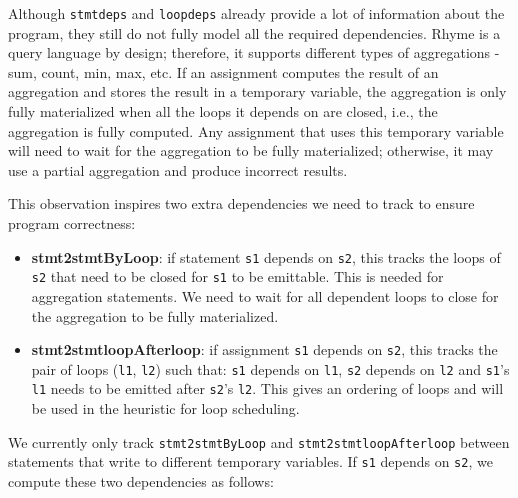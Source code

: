 \documentclass[sigplan, nonacm]{acmart}\settopmatter{printfolios=true,printccs=false,printacmref=false}
\begin{document}
\fi
Although \texttt{stmtdeps} and \texttt{loopdeps} already provide a lot of information about the program, they still do not fully model all the required dependencies. Rhyme is a query language by design; therefore, it supports different types of aggregations - sum, count, min, max, etc. If an assignment computes the result of an aggregation and stores the result in a temporary variable, the aggregation is only fully materialized when all the loops it depends on are closed, i.e., the aggregation is fully computed. Any assignment that uses this temporary variable will need to wait for the aggregation to be fully materialized; otherwise, it may use a partial aggregation and produce incorrect results.\par
This observation inspires two extra dependencies we need to track to ensure program correctness:
\begin{itemize}
\item \textbf{stmt2stmtByLoop}: if statement \texttt{s1} depends on \texttt{s2}, this tracks the loops of \texttt{s2} that need to be closed for \texttt{s1} to be emittable. This is needed for aggregation statements. We need to wait for all dependent loops to close for the aggregation to be fully materialized.
\item \textbf{stmt2stmtloopAfterloop}: if assignment \texttt{s1} depends on \texttt{s2}, this tracks the pair of loops (\texttt{l1}, \texttt{l2}) such that: \texttt{s1} depends on \texttt{l1}, \texttt{s2} depends on \texttt{l2} and \texttt{s1}'s \texttt{l1} needs to be emitted after \texttt{s2}'s \texttt{l2}. This gives an ordering of loops and will be used in the heuristic for loop scheduling.
\end{itemize}
We currently only track \texttt{stmt2stmtByLoop} and \texttt{stmt2stmtloopAfterloop} between statements that write to different temporary variables. If \texttt{s1} depends on \texttt{s2}, we compute these two dependencies as follows:\par
\end{document}
